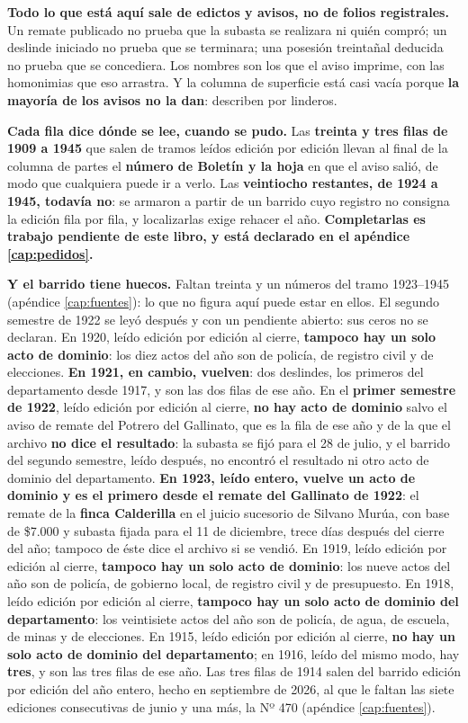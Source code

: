 \begin{cautela}
\textbf{Todo lo que está aquí sale de edictos y avisos, no de folios registrales.} Un remate
publicado no prueba que la subasta se realizara ni quién compró; un deslinde iniciado no prueba
que se terminara; una posesión treintañal deducida no prueba que se concediera. Los nombres son
los que el aviso imprime, con las homonimias que eso arrastra. Y la columna de superficie está
casi vacía porque \textbf{la mayoría de los avisos no la dan}: describen por linderos.

\textbf{Cada fila dice dónde se lee, cuando se pudo.} Las \textbf{treinta y tres filas de 1909 a 1945} que salen de tramos leídos edición por edición llevan al final de la columna de partes el \textbf{número de Boletín y la hoja} en que el aviso salió, de modo que cualquiera puede ir a verlo. Las \textbf{veintiocho restantes, de 1924 a 1945, todavía no}: se armaron a partir de un barrido cuyo registro no consigna la edición fila por fila, y localizarlas exige rehacer el año. \textbf{Completarlas es trabajo pendiente de este libro, y está declarado en el apéndice \ref{cap:pedidos}.}

\textbf{Y el barrido tiene huecos.} Faltan treinta y un números del tramo 1923--1945 (apéndice
\ref{cap:fuentes}): lo que no figura aquí puede estar en ellos. El segundo semestre de 1922 se leyó después y con un pendiente abierto: sus ceros no se declaran. En 1920, leído edición por edición al cierre, \textbf{tampoco hay un solo acto de dominio}: los diez actos del año son de policía, de registro civil y de elecciones. \textbf{En 1921, en cambio, vuelven}: dos deslindes, los primeros del departamento desde 1917, y son las dos filas de ese año. En el \textbf{primer semestre de 1922}, leído edición por edición al cierre, \textbf{no hay acto de dominio} salvo el aviso de remate del Potrero del Gallinato, que es la fila de ese año y de la que el archivo \textbf{no dice el resultado}: la subasta se fijó para el 28 de julio, y el barrido del segundo semestre, leído después, no encontró el resultado ni otro acto de dominio del departamento. \textbf{En 1923, leído entero, vuelve un acto de dominio y es el primero desde el remate del Gallinato de 1922}: el remate de la \textbf{finca Calderilla} en el juicio sucesorio de Silvano Murúa, con base de \$7.000 y subasta fijada para el 11 de diciembre, trece días después del cierre del año; tampoco de éste dice el archivo si se vendió. En 1919, leído edición por edición al cierre, \textbf{tampoco hay un solo acto de dominio}: los nueve actos del año son de policía, de gobierno local, de registro civil y de presupuesto. En 1918, leído edición por edición al cierre, \textbf{tampoco hay un solo acto de dominio del departamento}: los veintisiete actos del año son de policía, de agua, de escuela, de minas y de elecciones.  En 1915, leído edición por edición al cierre, \textbf{no hay un solo acto de dominio del departamento}; en 1916, leído del mismo modo, hay \textbf{tres}, y son las tres filas de ese año. Las tres filas de 1914 salen del barrido edición por edición del año entero, hecho en septiembre de 2026, al que le faltan las siete ediciones consecutivas de junio y una más, la Nº 470 (apéndice \ref{cap:fuentes}).


\end{cautela}
